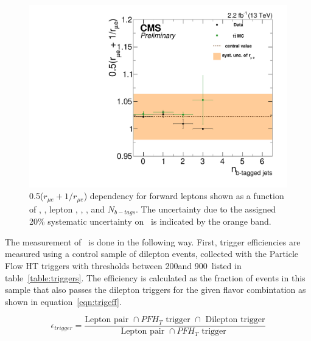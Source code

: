 \begin{figure}[htbp]
\begin{minipage}[t]{0.3\textwidth}
  \end{minipage}
  \begin{minipage}[t]{0.3\textwidth}
    \includegraphics[width=\textwidth]{bkgd/figs/rSFOFFromRMuE_ZPeakControlForward_Run2015_25ns_NBJets_None.pdf}
  \end{minipage}

  \caption{
    0.5($r_{\mu e}+1/r_{\mu e}$) dependency for forward leptons shown as a function of \nj, \nvtx, lepton \pt, \mll, \MET, and $N_{b-tags}$.
    The uncertainty due to the assigned 20\% systematic uncertainty on \rmue~is indicated by the orange band.
  }
  \label{fig:RDependencyForward}
\end{figure}

The measurement of \rt\ is done in the following way.
First, trigger efficiencies are measured using a control sample of dilepton events,
collected with the Particle Flow HT triggers with thresholds between 200\GeV and 900\GeV\ listed in table~\ref{table:triggers}.
The efficiency is calculated as the fraction of events in this sample that also passes the dilepton triggers for the given flavor combintation as shown in equation~\ref{eqn:trigeff}.

\begin{equation}
\label{eqn:trigeff}
  \epsilon_{trigger} =\frac{\text{Lepton pair }\cap PFH_T \text{ trigger } \cap\text{ Dilepton trigger}  }{\text{Lepton pair }\cap PFH_T \text{ trigger }}
\end{equation} 

